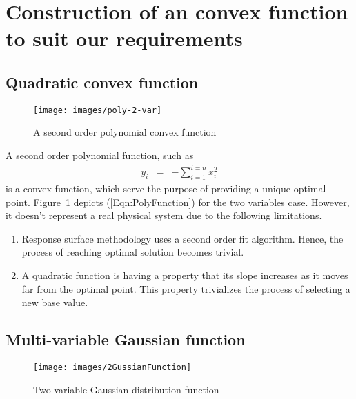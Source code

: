 \documentclass[twocolumn]{svjour3}          %
\begin{document}
	\section{Construction of an convex function to suit our requirements}
	\label{Sec:Construction}
	\subsection{Quadratic convex function}
	\begin{figure}
		\centering
		\texttt{[image: images/poly-2-var]}
		\label{Fig:TwoVariablePolynomial}
		\caption{A second order polynomial convex function}
	\end{figure}
	A second order polynomial function, such as
	\begin{eqnarray}
	y_i &=& -\sum_{i=1}^{i=n}{x_i^2} \label{Eqn:PolyFunction}
	\end{eqnarray}
	is a convex function, which serve the purpose of providing a unique optimal point. Figure~\ref{Fig:TwoVariablePolynomial} depicts (\ref{Eqn:PolyFunction}) for the two variables case. However, it doesn't represent a real physical system due to the following limitations.
	\begin{enumerate}
		\item Response surface methodology uses a second order fit algorithm. Hence, the process of reaching optimal solution becomes trivial.
		\item A quadratic function is having a property that its slope increases as it moves far from the optimal point. This property trivializes the process of selecting a new base value.
	\end{enumerate}
	\subsection{Multi-variable Gaussian function}
	\begin{figure}
		\centering
		\texttt{[image: images/2GussianFunction]}
		\label{Fig:TwoVarGaussian}
		\caption{Two variable Gaussian distribution function}
	\end{figure}
\end{document}

